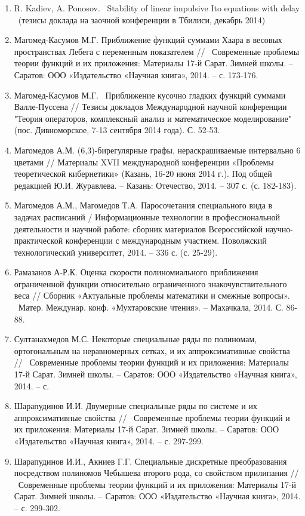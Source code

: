 \documentclass{article}
\begin{document}
\begin{enumerate}
\item  R. Kadiev, A. Ponosov. ~Stability of linear impulsive Ito equations with delay ~(тезисы доклада на заочной конференции в Тбилиси, декабрь 2014)

\item  Магомед-Касумов М.Г. Приближение функций суммами Хаара в весовых пространствах Лебега с переменным показателем // ~Современные проблемы теории функций и их приложения: Материалы 17-й Сарат. Зимней школы. -- Саратов: ООО «Издательство «Научная книга», 2014. -- с. 173-176.

\item  Магомед-Касумов М.Г. ~Приближение кусочно гладких функций суммами Валле-Пуссена // Тезисы докладов Международной научной конференции "Теория операторов, комплексный анализ и математическое моделирование" (пос. Дивноморское, 7-13 сентября 2014 года). С. 52-53.

\item  Магомедов А.М. (6,3)-бирегулярные графы, нераскрашиваемые интервально 6 цветами // Материалы XVII международной конференции «Проблемы теоретической кибернетики» (Казань, 16-20 июня 2014 г.). Под общей редакцией Ю.И. Журавлева. -- Казань: Отечество, 2014. -- 307 с. (с. 182-183).

\item  Магомедов А.М., Магомедов Т.А. Паросочетания специального вида в задачах расписаний / Информационные технологии в профессиональной деятельности и научной работе: сборник материалов Всероссийской научно-практической конференции с международным участием. Поволжский технологический университет, 2014. -- 336 с. (с. 25-29).

\item  Рамазанов А-Р.К. Оценка скорости полиномиального приближения ограниченной функции относительно ограниченного знакочувствительного веса // Сборник «Актуальные проблемы математики и смежные вопросы». ~Матер. Междунар. конф. «Мухтаровские чтения». -- Махачкала, 2014. С. 86-88.

\item  Султанахмедов М.С. Некоторые специальные ряды по полиномам, ортогональным на неравномерных сетках, и их аппроксимативные свойства // ~Современные проблемы теории функций и их приложения: Материалы 17-й Сарат. Зимней школы. -- Саратов: ООО «Издательство «Научная книга», 2014. -- с.

\item  Шарапудинов И.И. Двумерные специальные ряды по системе  и их аппроксимативные свойства // ~Современные проблемы теории функций и их приложения: Материалы 17-й Сарат. Зимней школы. -- Саратов: ООО «Издательство «Научная книга», 2014. -- с. 297-299.

\item  Шарапудинов И.И., Акниев Г.Г. Специальные дискретные преобразования посредством полиномов Чебышева второго рода, со свойством прилипания // ~Современные проблемы теории функций и их приложения: Материалы 17-й Сарат. Зимней школы. -- Саратов: ООО «Издательство «Научная книга», 2014. -- с. 299-302.
\end{enumerate}
\end{document}
